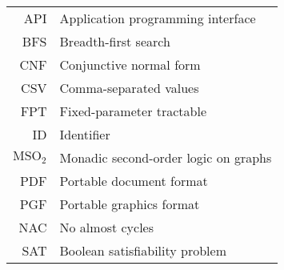 \documentclass[english,bachelor,unicode,oneside,bw]{ctufit-thesis}
\begin{document}
\tableofcontents %
\listoffigures %
\begingroup
\let\clearpage\relax
\listoftables %
\thectufitlistofalgorithmscommand{}
\endgroup

\chapter*{\thectufitabbreviationlabel}

\begin{tabular}{rl}
	API                & Application programming interface    \\
	BFS                & Breadth-first search                 \\
	CNF                & Conjunctive normal form              \\
	CSV                & Comma-separated values               \\
	FPT                & Fixed-parameter tractable            \\
	ID                 & Identifier                           \\
	\( \text{MSO}_2 \) & Monadic second-order logic on graphs \\
	PDF                & Portable document format             \\
	PGF                & Portable graphics format             \\
	NAC                & No almost cycles                     \\
	SAT                & Boolean satisfiability problem       \\
\end{tabular}
\resumeTOCentries{}
\mainmatter\mainmatterinit{} %

\listoftodos{}\newpage{}










% 

% 

\backmatter{} %

\printbibliography[heading=bibintoc]{}

\end{document}
